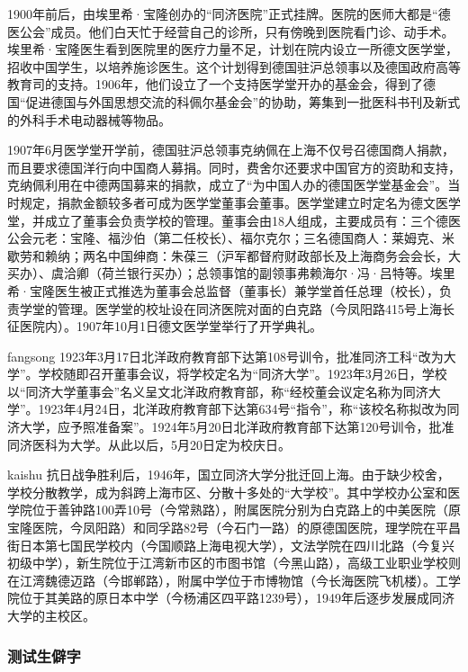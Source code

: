 {\songti

1900年前后，由埃里希·宝隆创办的“同济医院”正式挂牌。医院的医师大都是“德医公会”成员。他们白天忙于经营自己的诊所，只有傍晚到医院看门诊、动手术。埃里希·宝隆医生看到医院里的医疗力量不足，计划在院内设立一所德文医学堂，招收中国学生，以培养施诊医生。这个计划得到德国驻沪总领事以及德国政府高等教育司的支持。1906年，他们设立了一个支持医学堂开办的基金会，得到了德国“促进德国与外国思想交流的科佩尔基金会”的协助，筹集到一批医科书刊及新式的外科手术电动器械等物品。}

{\heiti 1907年6月医学堂开学前，德国驻沪总领事克纳佩在上海不仅号召德国商人捐款，而且要求德国洋行向中国商人募捐。同时，费舍尔还要求中国官方的资助和支持，克纳佩利用在中德两国募来的捐款，成立了“为中国人办的德国医学堂基金会”。当时规定，捐款金额较多者可成为医学堂董事会董事。医学堂建立时定名为德文医学堂，并成立了董事会负责学校的管理。董事会由18人组成，主要成员有：三个德医公会元老：宝隆、福沙伯（第二任校长）、福尔克尔；三名德国商人：莱姆克、米歇劳和赖纳；两名中国绅商：朱葆三（沪军都督府财政部长及上海商务会会长，大买办）、虞洽卿（荷兰银行买办）；总领事馆的副领事弗赖海尔·冯·吕特等。埃里希·宝隆医生被正式推选为董事会总监督（董事长）兼学堂首任总理（校长），负责学堂的管理。医学堂的校址设在同济医院对面的白克路（今凤阳路415号上海长征医院内）。1907年10月1日德文医学堂举行了开学典礼。}

{\ifcsname fangsong\endcsname\fangsong\else[无 \cs{fangsong} 字体。]\fi
1923年3月17日北洋政府教育部下达第108号训令，批准同济工科“改为大学”。学校随即召开董事会议，将学校定名为“同济大学”。1923年3月26日，学校以“同济大学董事会”名义呈文北洋政府教育部，称“经校董会议定名称为同济大学”。1923年4月24日，北洋政府教育部下达第634号“指令”，称“该校名称拟改为同济大学，应予照准备案”。1924年5月20日北洋政府教育部下达第120号训令，批准同济医科为大学。从此以后，5月20日定为校庆日。}

{\ifcsname kaishu\endcsname\kaishu\else[无 \cs{kaishu} 字体。]\fi
抗日战争胜利后，1946年，国立同济大学分批迁回上海。由于缺少校舍，学校分散教学，成为斜跨上海市区、分散十多处的“大学校”。其中学校办公室和医学院位于善钟路100弄10号（今常熟路），附属医院分别为白克路上的中美医院（原宝隆医院，今凤阳路）和同孚路82号（今石门一路）的原德国医院，理学院在平昌街日本第七国民学校内（今国顺路上海电视大学），文法学院在四川北路（今复兴初级中学），新生院位于江湾新市区的市图书馆（今黑山路），高级工业职业学校则在江湾魏德迈路（今邯郸路），附属中学位于市博物馆（今长海医院飞机楼）。工学院位于其美路的原日本中学（今杨浦区四平路1239号），1949年后逐步发展成同济大学的主校区。}

\subsubsection{测试生僻字}\label{sec:uncommon}

